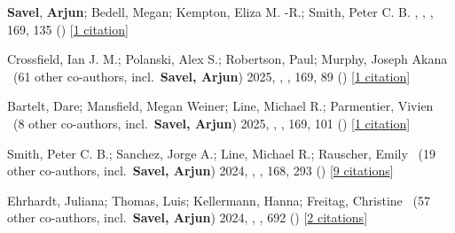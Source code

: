 \item[{\color{numcolor}\scriptsize44}] \textbf{Savel}, \textbf{Arjun}; Bedell, Megan; Kempton, Eliza M. -R.; Smith, Peter C. B. , , \aj, {169}, 135 () [\href{https://ui.adsabs.harvard.edu/abs/2025AJ....169..135S}{1 citation}]

\item[{\color{numcolor}\scriptsize43}] Crossfield, Ian J. M.; Polanski, Alex S.; Robertson, Paul; Murphy, Joseph Akana \etal\ ({61} other co-authors, incl.\ \textbf{Savel, Arjun}) 2025, , \aj, {169}, 89 () [\href{https://ui.adsabs.harvard.edu/abs/2025AJ....169...89C}{1 citation}]

\item[{\color{numcolor}\scriptsize42}] Bartelt, Dare; Mansfield, Megan Weiner; Line, Michael R.; Parmentier, Vivien \etal\ ({8} other co-authors, incl.\ \textbf{Savel, Arjun}) 2025, , \aj, {169}, 101 () [\href{https://ui.adsabs.harvard.edu/abs/2025AJ....169..101B}{1 citation}]

\item[{\color{numcolor}\scriptsize41}] Smith, Peter C. B.; Sanchez, Jorge A.; Line, Michael R.; Rauscher, Emily \etal\ ({19} other co-authors, incl.\ \textbf{Savel, Arjun}) 2024, , \aj, {168}, 293 () [\href{https://ui.adsabs.harvard.edu/abs/2024AJ....168..293S}{9 citations}]

\item[{\color{numcolor}\scriptsize40}] Ehrhardt, Juliana; Thomas, Luis; Kellermann, Hanna; Freitag, Christine \etal\ ({57} other co-authors, incl.\ \textbf{Savel, Arjun}) 2024, , \aanda, {692} () [\href{https://ui.adsabs.harvard.edu/abs/2024A&A...692A.220E}{2 citations}]


